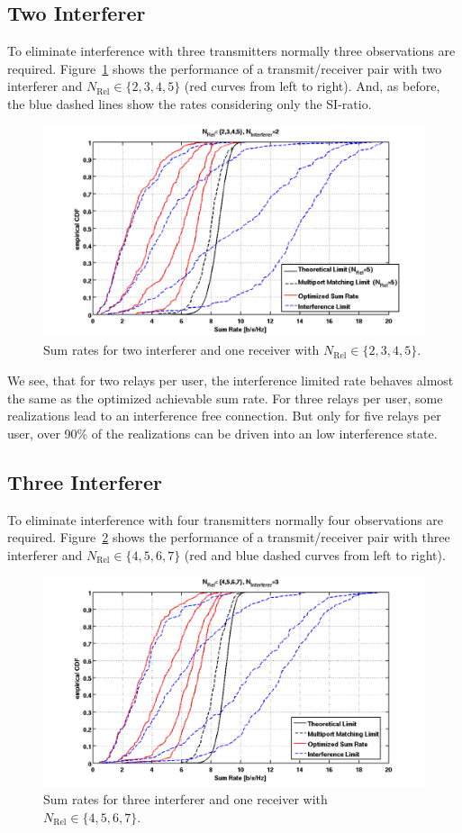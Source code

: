 \subsection{Two Interferer}
\label{sec:2interf}
To eliminate interference with three transmitters normally three observations are required.
Figure~\ref{fig:relcomp_2} shows the performance of a transmit/receiver pair with two interferer and $N_\text{Rel}\in\{2,3,4,5\}$ (red curves from left to right).
And, as before, the blue dashed lines show the rates considering only the SI-ratio.
\begin{figure}[h]
\centering
  \includegraphics[width=0.8\linewidth]{images/Relcomparison_2interferer.png}
\caption{Sum rates for two interferer and one receiver with  $N_\text{Rel}\in\{2,3,4,5\}$.}
\label{fig:relcomp_2}
\end{figure}

We see, that for two relays per user, the interference limited rate behaves almost the same as the optimized achievable sum rate.
For three relays per user, some realizations lead to an interference free connection.
But only for five relays per user, over 90\% of the realizations can be driven into an low interference state.

\subsection{Three Interferer}
\label{sec:3interf}
To eliminate interference with four transmitters normally four observations are required.
Figure~\ref{fig:relcomp_3} shows the performance of a transmit/receiver pair with three interferer and $N_\text{Rel}\in\{4,5,6,7\}$ (red and blue dashed curves from left to right).
\begin{figure}[h]
\centering
  \includegraphics[width=0.85\linewidth]{images/Relcomparison_3interferer.png}
\caption{Sum rates for three interferer and one receiver with $N_\text{Rel}\in\{4,5,6,7\}$.}
\label{fig:relcomp_3}
\end{figure}

